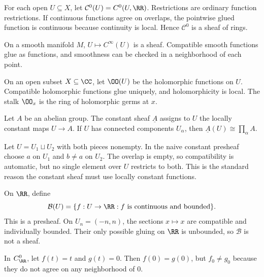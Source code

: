 \begin{example}
For each open $U\subseteq X$, let $\mathcal C^0(U)=C^0(U,\RR)$.  Restrictions are ordinary
function restrictions.  If continuous functions agree on overlaps, the pointwise glued
function is continuous because continuity is local.  Hence $\mathcal C^0$ is a sheaf of
rings.
\end{example}

\begin{example}
On a smooth manifold $M$, $U\mapsto C^\infty(U)$ is a sheaf.  Compatible smooth functions
glue as functions, and smoothness can be checked in a neighborhood of each point.
\end{example}

\begin{example}
On an open subset $X\subseteq\CC$, let $\OO(U)$ be the holomorphic functions on $U$.
Compatible holomorphic functions glue uniquely, and holomorphicity is local.  The stalk
$\OO_x$ is the ring of holomorphic germs at $x$.
\end{example}

\begin{example}
Let $A$ be an abelian group.  The constant sheaf $\underline A$ assigns to $U$ the locally
constant maps $U\to A$.  If $U$ has connected components $U_\alpha$, then
$\underline A(U)\cong\prod_\alpha A$.
\end{example}

\begin{example}
Let $U=U_1\sqcup U_2$ with both pieces nonempty.  In the naive constant presheaf choose
$a$ on $U_1$ and $b\neq a$ on $U_2$.  The overlap is empty, so compatibility is automatic,
but no single element over $U$ restricts to both.  This is the standard reason the constant
sheaf must use locally constant functions.
\end{example}

\begin{example}
On $\RR$, define
\[
\mathcal B(U)=\{f:U\to\RR : f\text{ is continuous and bounded}\}.
\]
This is a presheaf.  On $U_n=(-n,n)$, the sections $x\mapsto x$ are compatible and individually bounded.  Their only possible gluing on $\RR$ is unbounded, so $\mathcal B$ is not a sheaf.
\end{example}

\begin{example}
In $C^0_\RR$, let $f(t)=t$ and $g(t)=0$.  Then $f(0)=g(0)$, but $f_0\neq g_0$ because they
do not agree on any neighborhood of $0$.
\end{example}

